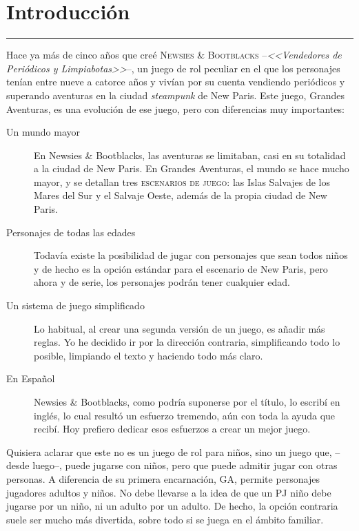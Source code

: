 \chapter{Introducción}

\rule[0]{\textwidth}{1pc}


Hace ya más de cinco años que creé \textsc{Newsies \& Bootblacks} --\emph{<<Vendedores de Periódicos y Limpiabotas>>}--, un juego de rol peculiar en el que los personajes tenían entre nueve a catorce años y vivían por su cuenta vendiendo periódicos y superando aventuras en la ciudad \emph{steampunk} de New Paris. Este juego, Grandes Aventuras, es una evolución de ese juego, pero con diferencias muy importantes:

\begin{description}
\item[Un mundo mayor] En Newsies \& Bootblacks, las aventuras se limitaban, casi en su totalidad a la ciudad de New Paris. En Grandes Aventuras, el mundo se hace mucho mayor, y se detallan tres \textsc{escenarios de juego}: las Islas Salvajes de los Mares del Sur y el Salvaje Oeste, además de la propia ciudad de New Paris.
\item[Personajes de todas las edades] Todavía existe la posibilidad de jugar con personajes que sean todos niños y de hecho es la opción estándar para el escenario de New Paris, pero ahora y de serie, los personajes podrán tener cualquier edad.
\item[Un sistema de juego simplificado] Lo habitual, al crear una segunda versión de un juego, es añadir más reglas. Yo he decidido ir por la dirección contraria, simplificando todo lo posible, limpiando el texto y haciendo todo más claro. 
\item[En Español] Newsies \& Bootblacks, como podría suponerse por el título, lo escribí en inglés, lo cual resultó un esfuerzo tremendo, aún con toda la ayuda que recibí. Hoy prefiero dedicar esos esfuerzos a crear un mejor juego.
\end{description}

Quisiera aclarar que este no es un juego de rol para niños, sino un juego que, --desde luego--, puede jugarse con niños, pero que puede admitir jugar con otras personas. A diferencia de su primera encarnación, GA, permite personajes jugadores adultos y niños. No debe llevarse a la idea de que un PJ niño debe jugarse por un niño, ni un adulto por un adulto. De hecho, la opción contraria suele ser mucho más divertida, sobre todo si se juega en el ámbito familiar.

